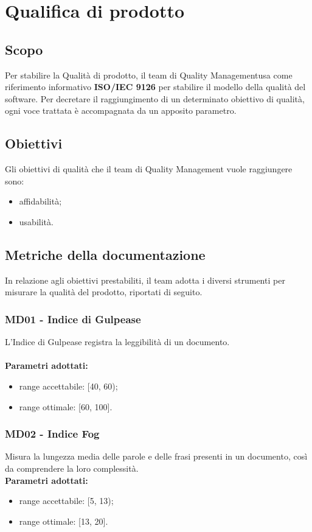 \section{Qualifica di prodotto}
\subsection{Scopo}
Per stabilire la Qualità di prodotto, il team di Quality Management\glo usa come riferimento informativo \textbf{ISO/IEC 9126} per stabilire il modello della qualità del software. Per decretare il raggiungimento di un determinato obiettivo di qualità, ogni voce trattata è accompagnata da un apposito parametro.
\subsection{Obiettivi}
Gli obiettivi di qualità che il team di Quality Management vuole raggiungere sono:
\begin{itemize}
\item affidabilità;
\item usabilità.
\end{itemize}
\subsection{Metriche della documentazione}
In relazione agli obiettivi prestabiliti, il team adotta i diversi strumenti per misurare la qualità del prodotto, riportati di seguito.
\subsubsection{MD01 - Indice di Gulpease}
L'Indice di Gulpease registra la leggibilità di un documento. \\ \\ 
\textbf{Parametri adottati:} 
\begin{itemize}
\item range accettabile: [40, 60);
\item range ottimale: [60, 100].
\end{itemize}

\subsubsection{MD02 - Indice Fog}
Misura la lungezza media delle parole e delle frasi presenti in un documento, così da comprendere la loro complessità.\\
\textbf{Parametri adottati:} 
\begin{itemize}
\item range accettabile: [5, 13);
\item range ottimale: [13, 20].
\end{itemize}

